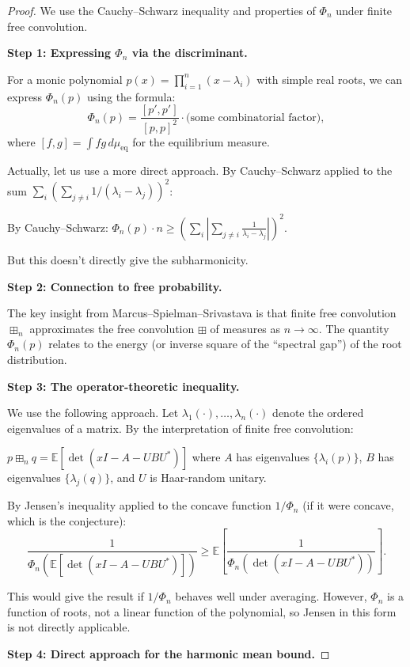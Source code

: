 \documentclass[12pt]{article}
\begin{document}
\begin{proof}
We use the Cauchy--Schwarz inequality and properties of $\Phi_n$ under finite free convolution.

\textbf{Step 1: Expressing $\Phi_n$ via the discriminant.}

For a monic polynomial $p(x) = \prod_{i=1}^n(x-\lambda_i)$ with simple real roots, we can express $\Phi_n(p)$ using the formula:
\[
\Phi_n(p) = \frac{[p', p']}{[p,p]^2} \cdot \text{(some combinatorial factor)},
\]
where $[f, g] = \int f g \, d\mu_{\mathrm{eq}}$ for the equilibrium measure.

Actually, let us use a more direct approach. By Cauchy--Schwarz applied to the sum $\sum_i (\sum_{j\neq i} 1/(\lambda_i - \lambda_j))^2$:

By Cauchy--Schwarz: $\Phi_n(p) \cdot n \geq \left(\sum_i \left|\sum_{j\neq i} \frac{1}{\lambda_i - \lambda_j}\right|\right)^2$.

But this doesn't directly give the subharmonicity.

\textbf{Step 2: Connection to free probability.}

The key insight from Marcus--Spielman--Srivastava is that finite free convolution $\boxplus_n$ approximates the free convolution $\boxplus$ of measures as $n \to \infty$. The quantity $\Phi_n(p)$ relates to the energy (or inverse square of the ``spectral gap'') of the root distribution.

\textbf{Step 3: The operator-theoretic inequality.}

We use the following approach. Let $\lambda_1(\cdot), \ldots, \lambda_n(\cdot)$ denote the ordered eigenvalues of a matrix. By the interpretation of finite free convolution:

$p \boxplus_n q = \mathbb{E}[\det(xI - A - UBU^*)]$ where $A$ has eigenvalues $\{\lambda_i(p)\}$, $B$ has eigenvalues $\{\lambda_j(q)\}$, and $U$ is Haar-random unitary.

By Jensen's inequality applied to the concave function $1/\Phi_n$ (if it were concave, which is the conjecture):
\[
\frac{1}{\Phi_n(\mathbb{E}[\det(xI-A-UBU^*)])} \geq \mathbb{E}\left[\frac{1}{\Phi_n(\det(xI-A-UBU^*))}\right].
\]

This would give the result if $1/\Phi_n$ behaves well under averaging. However, $\Phi_n$ is a function of roots, not a linear function of the polynomial, so Jensen in this form is not directly applicable.

\textbf{Step 4: Direct approach for the harmonic mean bound.}


\end{proof}
\end{document}
